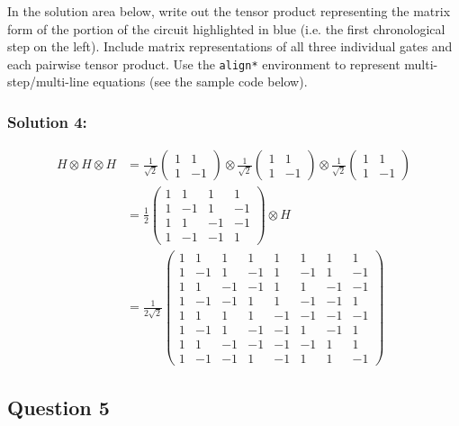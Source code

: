\documentclass{article}
\begin{document}
In the solution area below, write out the tensor product representing the matrix form of the portion of the
circuit highlighted in blue (i.e. the first chronological step on the left). Include matrix representations of
all three individual gates and each pairwise tensor product. Use the \texttt{align*} environment to represent
multi-step/multi-line equations (see the sample code below).

\subsubsection*{Solution 4:}



\vspace{5mm}

\begin{align*}
H\otimes H\otimes H
&=\frac1{\sqrt2}\begin{pmatrix}1&1\\1&-1\end{pmatrix}\otimes\frac1{\sqrt2}\begin{pmatrix}1&1\\1&-1\end{pmatrix}\otimes\frac1{\sqrt2}\begin{pmatrix}1&1\\1&-1\end{pmatrix}\\
&=\frac12\begin{pmatrix}1&1&1&1\\1&-1&1&-1\\1&1&-1&-1\\1&-1&-1&1\end{pmatrix}\otimes H\\
&=\frac1{2\sqrt2}\begin{pmatrix}1&1&1&1&1&1&1&1\\1&-1&1&-1&1&-1&1&-1\\1&1&-1&-1&1&1&-1&-1\\1&-1&-1&1&1&-1&-1&1\\1&1&1&1&-1&-1&-1&-1\\1&-1&1&-1&-1&1&-1&1\\1&1&-1&-1&-1&-1&1&1\\1&-1&-1&1&-1&1&1&-1\end{pmatrix}\end{align*}

\vspace{5mm}

\subsection*{Question 5}
\end{document}
